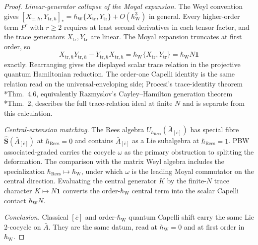 \documentclass[11pt]{memoir}
\begin{document}
\begin{proof}
  \emph{Linear-generator collapse of the Moyal expansion.}
  The Weyl convention gives
  \([X_{\mathrm{tr},\hbar},Y_{\mathrm{tr},\hbar}]_*
  =\hbar_{\mathrm{W}}\{X_{\mathrm{tr}},Y_{\mathrm{tr}}\}
  +O(\hbar_{\mathrm{W}}^3)\) in general.
  Every higher-order term \(P^r\) with \(r\ge2\) requires at least second
  derivatives in each tensor factor, and the trace generators
  \(X_{\mathrm{tr}},Y_{\mathrm{tr}}\) are linear.  The Moyal expansion
  truncates at first order, so
  \[
    X_{\mathrm{tr},\hbar}Y_{\mathrm{tr},\hbar}
    -Y_{\mathrm{tr},\hbar}X_{\mathrm{tr},\hbar}
    =\hbar_{\mathrm{W}}\{X_{\mathrm{tr}},Y_{\mathrm{tr}}\}
    =\hbar_{\mathrm{W}}N\mathbf 1
  \]
  exactly.  Rearranging gives the displayed scalar trace relation in the
  projective quantum Hamiltonian reduction.  The order-one
  Capelli identity \cite{capelli}\cite{howe-capelli} is the same relation
  read on the universal-enveloping side; Procesi's trace-identity theorem
  \cite{procesi}*{Thm.~4.6}, equivalently Razmyslov's Cayley--Hamilton
  generation theorem \cite{razmyslov}*{Thm.~2}, describes the full
  trace-relation ideal at finite $N$ and is separate from this calculation.

  \emph{Central-extension matching.}  The Rees algebra
  $U_{\hbar_{\mathrm{Rees}}}(\bar A_{[\bar c]})$ has special fibre
  $\widehat{\mathbf S}(\bar A_{[\bar c]})$ at
  \(\hbar_{\mathrm{Rees}}=0\) and contains
  $\bar A_{[\bar c]}$ as a Lie subalgebra at \(\hbar_{\mathrm{Rees}}=1\).
  PBW associated-graded carries the cocycle $\omega$ as the primary
  obstruction to splitting the deformation. The comparison with the matrix
  Weyl algebra includes the specialization
  \(\hbar_{\mathrm{Rees}}\mapsto\hbar_{\mathrm{W}}\), under which
  \(\omega\) is the leading Moyal commutator on the central direction.
  Evaluating the central generator $K$ by the finite-$N$ trace character
  $K\mapsto N\mathbf1$ converts the order-\(\hbar_{\mathrm{W}}\) central term
  into the scalar Capelli contact \(\hbar_{\mathrm{W}}N\).

  \emph{Conclusion.}  Classical $[\bar c]$ and order-\(\hbar_{\mathrm{W}}\) quantum
  Capelli shift carry the same Lie 2-cocycle on $\bar A$.  They are the
  same datum, read at \(\hbar_{\mathrm{W}}=0\) and at first order in
  \(\hbar_{\mathrm{W}}\).
\end{proof}
\end{document}

